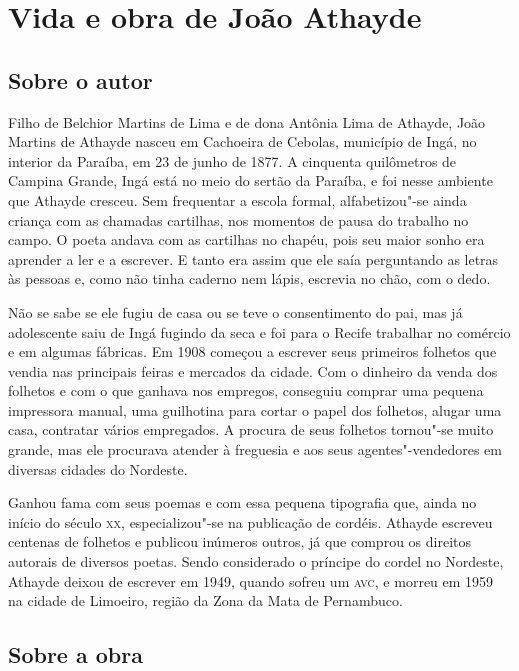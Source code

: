 \chapter{Vida e obra de João Athayde}

\section{Sobre o autor}

Filho de Belchior Martins de Lima e de dona Antônia
Lima de Athayde,
João Martins de Athayde nasceu em Cachoeira de Cebolas, município de
Ingá, no interior da Paraíba, em 23 de junho de 1877. A cinquenta
quilômetros de Campina Grande, Ingá está no meio do sertão da Paraíba,
e foi nesse ambiente que Athayde cresceu. Sem frequentar a escola
formal, alfabetizou"-se ainda criança com as chamadas cartilhas, nos
momentos de pausa do trabalho no campo.
O poeta andava com
as cartilhas no chapéu, pois seu maior sonho era
aprender a ler e a escrever. E tanto era assim que ele saía
perguntando as letras às pessoas e, como não tinha caderno
nem lápis, escrevia no chão, com o dedo.

Não se sabe se ele fugiu de casa ou se teve o
consentimento do pai, mas
já adolescente saiu de Ingá
fugindo da seca e foi para o Recife trabalhar no comércio e em
algumas fábricas. Em 1908 começou a escrever seus primeiros folhetos
que vendia nas principais feiras e mercados da cidade.
Com o dinheiro da venda dos folhetos e com o que
ganhava nos empregos, conseguiu comprar uma pequena
impressora manual, uma guilhotina para cortar o papel
dos folhetos, alugar uma casa, contratar vários empregados.
A procura de seus folhetos tornou"-se muito grande, mas ele
procurava atender à freguesia e aos seus 
agentes"-vendedores em diversas cidades do Nordeste.

Ganhou fama com
seus poemas e com essa pequena tipografia que, ainda no início do século
\textsc{xx}, especializou"-se na publicação de cordéis. Athayde escreveu centenas
de folhetos e publicou inúmeros outros, já que comprou os direitos
autorais de diversos poetas. Sendo considerado o príncipe do cordel no
Nordeste, Athayde deixou de escrever em 1949, quando sofreu um \textsc{avc}, e
morreu em 1959 na cidade de Limoeiro, região da Zona da Mata de
Pernambuco.

\section{Sobre a obra}

